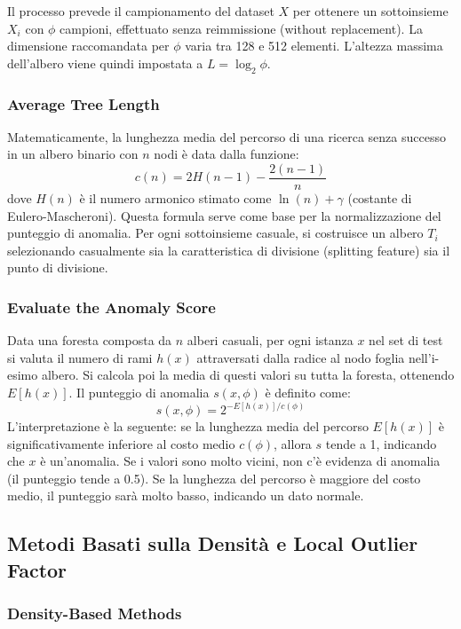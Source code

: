 Il processo prevede il campionamento del dataset $X$ per ottenere
un sottoinsieme $X_i$ con $\phi$ campioni, effettuato senza
reimmissione (without replacement). La dimensione raccomandata
per $\phi$ varia tra 128 e 512 elementi. L'altezza massima
dell'albero viene quindi impostata a $L = \log_2 \phi$.

\subsubsection{Average Tree Length}

Matematicamente, la lunghezza media del percorso di una ricerca
senza successo in un albero binario con $n$ nodi è data dalla
funzione:
\[
    c(n) = 2H(n-1) - \frac{2(n-1)}{n}
\]
dove $H(n)$ è il numero armonico stimato come
$\ln(n) + \gamma$ (costante di Eulero-Mascheroni). Questa formula
serve come base per la normalizzazione del punteggio di anomalia.
Per ogni sottoinsieme casuale, si costruisce un albero $T_i$
selezionando casualmente sia la caratteristica di divisione
(splitting feature) sia il punto di divisione.

\subsubsection{Evaluate the Anomaly Score}

Data una foresta composta da $n$ alberi casuali, per ogni
istanza $x$ nel set di test si valuta il numero di rami $h(x)$
attraversati dalla radice al nodo foglia nell'i-esimo albero.
Si calcola poi la media di questi valori su tutta la foresta,
ottenendo $E[h(x)]$. Il punteggio di anomalia $s(x, \phi)$
è definito come:
\[
    s(x, \phi) = 2^{-E[h(x)]/c(\phi)}
\]
L'interpretazione è la seguente: se la lunghezza media del
percorso $E[h(x)]$ è significativamente inferiore al costo medio
$c(\phi)$, allora $s$ tende a 1, indicando che $x$ è
un'anomalia. Se i valori sono molto vicini, non c'è evidenza
di anomalia (il punteggio tende a 0.5). Se la lunghezza del
percorso è maggiore del costo medio, il punteggio sarà molto
basso, indicando un dato normale.

\subsection{Metodi Basati sulla Densità e Local Outlier Factor}

\subsubsection{Density-Based Methods}

